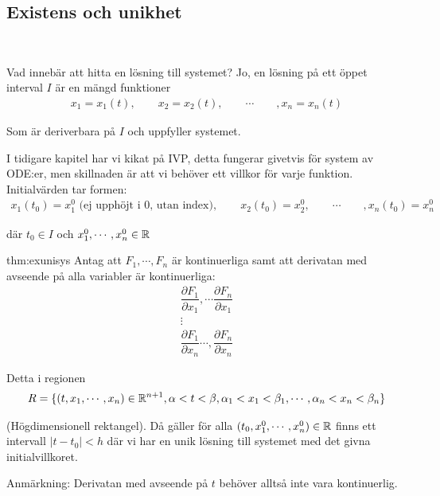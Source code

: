 \subsection{Existens och unikhet}\hfill\\
\newpage
\par\bigskip
\noindent Vad innebär att hitta en lösning till systemet? Jo, en lösning på ett öppet interval $I$ är en mängd funktioner
\begin{equation*}
  \begin{gathered}
    x_1 = x_1(t),\qquad x_2 = x_2(t),\qquad\cdots\qquad, x_n = x_n(t)
  \end{gathered}
\end{equation*}\par
\noindent Som är deriverbara på $I$ och uppfyller systemet.
\par\bigskip
\noindent I tidigare kapitel har vi kikat på IVP, detta fungerar givetvis för system av ODE:er, men skillnaden är att vi behöver ett villkor för varje funktion. Initialvärden tar formen:
\begin{equation*}
  \begin{gathered}
    x_1(t_0)=x_1^0 \text{ (ej upphöjt i 0, utan index)},\qquad x_2(t_0)=x_2^0,\qquad\cdots\qquad, x_n(t_0) = x_n^0
  \end{gathered}
\end{equation*}\par
\noindent där $t_0\in I$ och $x_1^0,\cdots, x_n^0\in\mathbb{R}$
\par\bigskip
\begin{theo}{thm:exunisys}
  Antag att $F_1,\cdots, F_n$ är kontinuerliga samt att derivatan med avseende på alla variabler är kontinuerliga:
  \begin{equation*}
    \begin{gathered}
      \dfrac{\partial F_1}{\partial x_1},\cdots \dfrac{\partial F_n}{\partial x_1}\\
      \vdots\\
      \dfrac{\partial F_1}{\partial x_n}\cdots, \dfrac{\partial F_n}{\partial x_n}
    \end{gathered}
  \end{equation*}\par
  \noindent Detta i regionen
  \begin{equation*}
    \begin{gathered}
      R = \{(t,x_1,\cdots,x_n)\in\mathbb{R}^{n+1}, \alpha<t<\beta, \alpha_1<x_1<\beta_1,\cdots, \alpha_n<x_n<\beta_n\}
    \end{gathered}
  \end{equation*}\par
  \noindent (Högdimensionell rektangel). Då gäller för alla $(t_0, x_1^0, \cdots, x_n^0)\in\mathbb{R}$ finns ett intervall $\left|t-t_0\right|<h$ där vi har en unik lösning till systemet med det givna initialvillkoret.\par
  \noindent Anmärkning: Derivatan med avseende på $t$ behöver alltså inte vara kontinuerlig.  
\end{theo}
